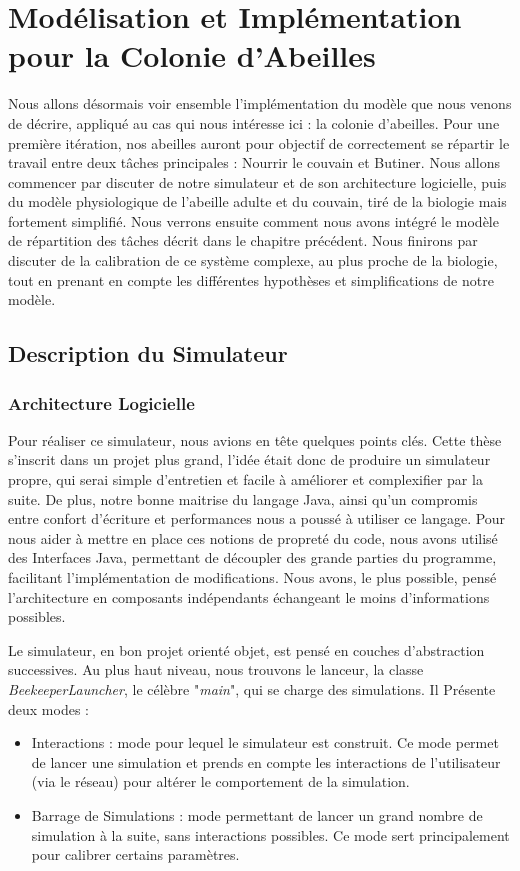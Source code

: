 \chapter{Modélisation et Implémentation pour la Colonie d'Abeilles}

	Nous allons désormais voir ensemble l'implémentation du modèle que nous venons de décrire, appliqué au cas qui nous intéresse ici : la colonie d'abeilles. Pour une première itération, nos abeilles auront pour objectif de correctement se répartir le travail entre deux tâches principales : Nourrir le couvain et Butiner. Nous allons commencer par discuter de notre simulateur et de son architecture logicielle, puis du modèle physiologique de l'abeille adulte et du couvain, tiré de la biologie mais fortement simplifié. Nous verrons ensuite comment nous avons intégré le modèle de répartition des tâches décrit dans le chapitre précédent. Nous finirons par discuter de la calibration de ce système complexe, au plus proche de la biologie, tout en prenant en compte les différentes hypothèses et simplifications de notre modèle.
	
	\section{Description du Simulateur}
		\subsection{Architecture Logicielle}
			Pour réaliser ce simulateur, nous avions en tête quelques points clés. Cette thèse s'inscrit dans un projet plus grand, l'idée était donc de produire un simulateur propre, qui serai simple d'entretien et facile à améliorer et complexifier par la suite. De plus, notre bonne maitrise du langage Java, ainsi qu'un compromis entre confort d'écriture et performances nous a poussé à utiliser ce langage. Pour nous aider à mettre en place ces notions de propreté du code, nous avons utilisé des Interfaces Java, permettant de découpler des grande parties du programme, facilitant l'implémentation de modifications. Nous avons, le plus possible, pensé l'architecture en composants indépendants échangeant le moins d'informations possibles.
			
			Le simulateur, en bon projet orienté objet, est pensé en couches d'abstraction successives. Au plus haut niveau, nous trouvons le lanceur, la classe \textit{BeekeeperLauncher}, le célèbre "\textit{main}", qui se charge des simulations. Il Présente deux modes :
	\begin{itemize}
		\item Interactions : mode pour lequel le simulateur est construit. Ce mode permet de lancer une simulation et prends en compte les interactions de l'utilisateur (via le réseau) pour altérer le comportement de la simulation.
		\item Barrage de Simulations : mode permettant de lancer un grand nombre de simulation à la suite, sans interactions possibles. Ce mode sert principalement pour calibrer certains paramètres.
	\end{itemize}				
			
